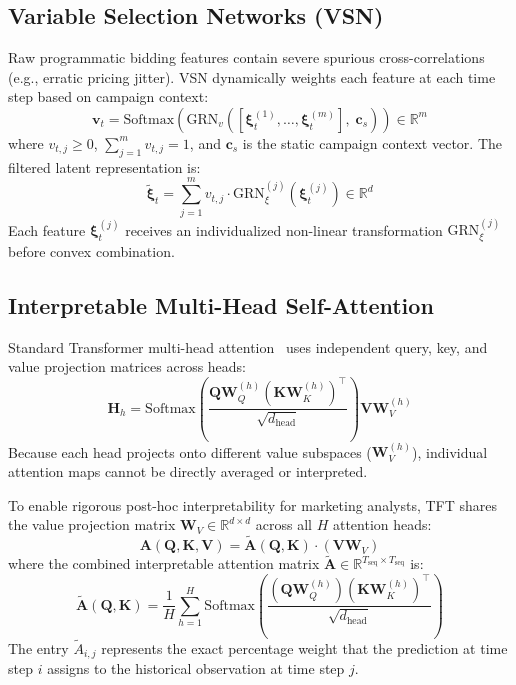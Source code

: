 \documentclass[11pt,a4paper]{article}
\begin{document}
\subsection{Variable Selection Networks (VSN)}
Raw programmatic bidding features contain severe spurious cross-correlations (e.g., erratic pricing jitter). VSN dynamically weights each feature at each time step based on campaign context:
\begin{equation}
    \mathbf{v}_t = \mathrm{Softmax}\left(\mathrm{GRN}_v\left([\boldsymbol{\xi}_t^{(1)}, \dots, \boldsymbol{\xi}_t^{(m)}], \; \mathbf{c}_s\right)\right) \in \mathbb{R}^m
\end{equation}
where $v_{t, j} \ge 0$, $\sum_{j=1}^m v_{t, j} = 1$, and $\mathbf{c}_s$ is the static campaign context vector. The filtered latent representation is:
\begin{equation}
    \tilde{\boldsymbol{\xi}}_t = \sum_{j=1}^m v_{t, j} \cdot \mathrm{GRN}_\xi^{(j)}\left(\boldsymbol{\xi}_t^{(j)}\right) \in \mathbb{R}^d
\end{equation}
Each feature $\boldsymbol{\xi}_t^{(j)}$ receives an individualized non-linear transformation $\mathrm{GRN}_\xi^{(j)}$ before convex combination.

\subsection{Interpretable Multi-Head Self-Attention}
Standard Transformer multi-head attention~\cite{vaswani2017attention} uses independent query, key, and value projection matrices across heads:
\begin{equation}
    \mathbf{H}_h = \mathrm{Softmax}\left(\frac{\mathbf{Q} \mathbf{W}_Q^{(h)} (\mathbf{K} \mathbf{W}_K^{(h)})^\top}{\sqrt{d_{\text{head}}}}\right) \mathbf{V} \mathbf{W}_V^{(h)}
\end{equation}
Because each head projects onto different value subspaces ($\mathbf{W}_V^{(h)}$), individual attention maps cannot be directly averaged or interpreted. 

To enable rigorous post-hoc interpretability for marketing analysts, TFT shares the value projection matrix $\mathbf{W}_V \in \mathbb{R}^{d \times d}$ across all $H$ attention heads:
\begin{equation}
    \mathbf{A}(\mathbf{Q}, \mathbf{K}, \mathbf{V}) = \tilde{\mathbf{A}}(\mathbf{Q}, \mathbf{K}) \cdot \left(\mathbf{V} \mathbf{W}_V\right)
\end{equation}
where the combined interpretable attention matrix $\tilde{\mathbf{A}} \in \mathbb{R}^{T_{\text{seq}} \times T_{\text{seq}}}$ is:
\begin{equation}
    \tilde{\mathbf{A}}(\mathbf{Q}, \mathbf{K}) = \frac{1}{H} \sum_{h=1}^H \mathrm{Softmax}\left(\frac{\left(\mathbf{Q} \mathbf{W}_Q^{(h)}\right) \left(\mathbf{K} \mathbf{W}_K^{(h)}\right)^\top}{\sqrt{d_{\text{head}}}}\right)
\end{equation}
The entry $\tilde{A}_{i, j}$ represents the exact percentage weight that the prediction at time step $i$ assigns to the historical observation at time step $j$.
\end{document}
